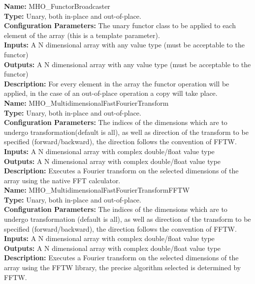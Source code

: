\noindent \textbf{Name:}  MHO\_FunctorBroadcaster \\
\textbf{Type:} Unary, both in-place and out-of-place. \\
\textbf{Configuration Parameters:} The unary functor class to be applied to each element of the array (this is a template parameter).\\
\textbf{Inputs:} A N dimensional array with any value type (must be acceptable to the functor)\\
\textbf{Outputs:} A N dimensional array with any value type (must be acceptable to the functor)\\
\textbf{Description:} For every element in the array the functor operation will be applied, in the case of an out-of-place operation a copy will take place.\\


\noindent \textbf{Name:} MHO\_MultidimensionalFastFourierTransform \\
\textbf{Type:} Unary, both in-place and out-of-place. \\
\textbf{Configuration Parameters:} The indices of the dimensions which are to undergo transformation(default is all), as well as direction of the transform to be specified (forward/backward), the direction follows the convention of FFTW.\\
\textbf{Inputs:} A N dimensional array with complex double/float value type \\
\textbf{Outputs:} A N dimensional array with complex double/float value type \\
\textbf{Description:} Executes a Fourier transform on the selected dimensions of the array using the native FFT calculator.\\


\noindent \textbf{Name:} MHO\_MultidimensionalFastFourierTransformFFTW \\
\textbf{Type:} Unary, both in-place and out-of-place. \\
\textbf{Configuration Parameters:} The indices of the dimensions which are to undergo transformation (default is all), as well as direction of the transform to be specified (forward/backward), the direction follows the convention of FFTW.\\
\textbf{Inputs:} A N dimensional array with complex double/float value type \\
\textbf{Outputs:} A N dimensional array with complex double/float value type \\
\textbf{Description:} Executes a Fourier transform on the selected dimensions of the array using the FFTW library, the precise algorithm selected is determined by FFTW.\\


